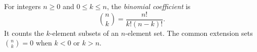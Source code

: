 
For integers $n\ge0$ and $0\le k\le n$, the \emph{binomial coefficient} is
\[
\binom nk=\frac{n!}{k!(n-k)!}.
\]
It counts the $k$-element subsets of an $n$-element set. The common extension sets $\binom nk=0$ when $k<0$ or $k>n$.
